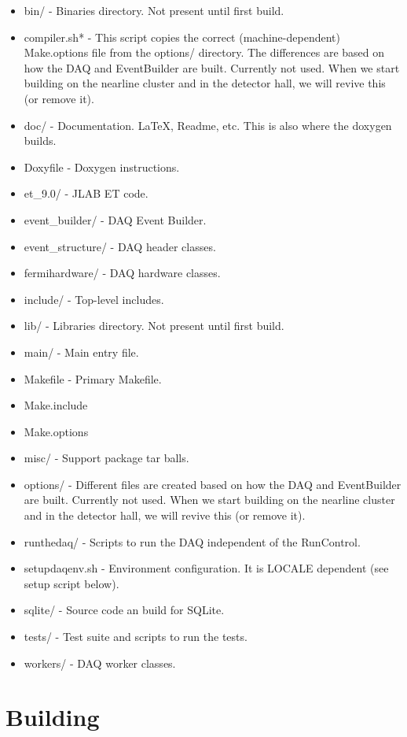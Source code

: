 \begin{itemize}

\item bin/ - Binaries directory. Not present until first build.
\item compiler.sh* - This script copies the correct (machine-dependent) Make.options file from the options/ directory. The differences are based on how the DAQ and EventBuilder are built. Currently not used. When we start building on the nearline cluster and in the detector hall, we will revive this (or remove it).
\item doc/ - Documentation. LaTeX, Readme, etc. This is also where the doxygen builds.
\item Doxyfile - Doxygen instructions.
\item et\_9.0/ - JLAB ET code.
\item event\_builder/ - \minerva DAQ Event Builder.
\item event\_structure/ - \minerva DAQ header classes.
\item fermihardware/ - \minerva DAQ hardware classes.
\item include/ - Top-level includes.
\item lib/ - Libraries directory. Not present until first build.
\item main/ - Main entry file.
\item Makefile - Primary Makefile.
\item Make.include 
\item Make.options
\item misc/ - Support package tar balls.
\item options/ - Different files are created based on how the DAQ and EventBuilder are built. Currently not used. When we start building on the nearline cluster and in the detector hall, we will revive this (or remove it).
\item runthedaq/ - Scripts to run the DAQ independent of the RunControl.
\item setupdaqenv.sh - Environment configuration. It is LOCALE dependent (see setup script below).
\item sqlite/ - Source code an build for SQLite.
\item tests/ - Test suite and scripts to run the tests.
\item workers/ - \minerva DAQ worker classes.

\end{itemize}

\section{Building}

